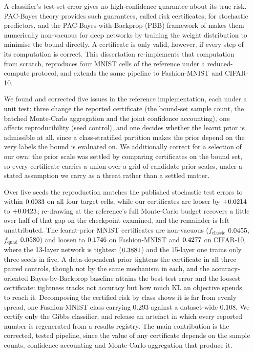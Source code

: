 A classifier's test-set error gives no high-confidence guarantee about its true
risk. PAC-Bayes theory provides such guarantees, called risk certificates, for
stochastic predictors, and the PAC-Bayes-with-Backprop (PBB) framework of
\textcite{perezortiz2021} makes them numerically non-vacuous for deep networks by
training the weight distribution to minimise the bound directly. A certificate is
only valid, however, if every step of its computation is correct. This
dissertation re-implements that computation from scratch, reproduces four MNIST
cells of the reference under a reduced-compute protocol, and extends the same
pipeline to Fashion-MNIST and CIFAR-10.

We found and corrected five issues in the reference implementation, each under a
unit test: three change the reported certificate (the bound-set sample count, the
batched Monte-Carlo aggregation and the joint confidence accounting), one affects
reproducibility (seed control), and one decides whether the learnt prior is
admissible at all, since a class-stratified partition makes the prior depend on
the very labels the bound is evaluated on. We additionally correct for a
selection of our own: the prior scale was settled by comparing certificates on
the bound set, so every certificate carries a union over a grid of candidate
prior scales, under a stated assumption we carry as a threat rather than a
settled matter.

Over five seeds the reproduction matches the published stochastic test errors to
within $0.0033$ on all four target cells, while our certificates
are looser by $+0.0214$ to $+0.0423$; re-drawing at the
reference's full Monte-Carlo budget recovers a little over half of that gap on
the checkpoint examined, and the remainder is left unattributed. The learnt-prior
MNIST certificates are non-vacuous ($f_{\text{classic}}$
$0.0455$, $f_{\text{quad}}$ $0.0580$) and
loosen to $0.1746$ on Fashion-MNIST and
$0.4277$ on CIFAR-10, where the 13-layer network is
tightest ($0.3881$) and the 15-layer one trains
only three seeds in five. A data-dependent prior tightens the certificate in all
three paired controls, though not by the same mechanism in each, and the
accuracy-oriented Bayes-by-Backprop baseline attains the best test error and the
loosest certificate: tightness tracks not accuracy but how much KL an objective
spends to reach it. Decomposing the certified risk by class shows it is far from
evenly spread, one Fashion-MNIST class carrying $0.293$ against a dataset-wide
$0.108$. We certify only the Gibbs classifier, and release an artefact in which
every reported number is regenerated from a results registry. The main
contribution is the corrected, tested pipeline, since the value of any
certificate depends on the sample counts, confidence accounting and Monte-Carlo
aggregation that produce it.
